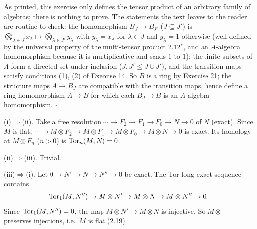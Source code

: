 \documentclass[11pt]{article}
\begin{document}
\pf
As printed, this exercise only defines the tensor product of an arbitrary family of algebras; there is nothing to prove. The statements the text leaves to the reader are routine to check:
the homomorphism $B_J\to B_{J'}$ ($J\subseteq J'$) is $\bigotimes_{\lambda\in J}x_\lambda\mapsto\bigotimes_{\lambda\in J'}y_\lambda$ with $y_\lambda=x_\lambda$ for $\lambda\in J$ and $y_\lambda=1$ otherwise (well defined by the universal property of the multi-tensor product 2.12$^*$, and an $A$-algebra homomorphism because it is multiplicative and sends $1$ to $1$); the finite subsets of $\Lambda$ form a directed set under inclusion ($J,J'\le J\cup J'$), and the transition maps satisfy conditions (1), (2) of Exercise 14. So $B$ is a ring by Exercise 21; the structure maps $A\to B_J$ are compatible with the transition maps, hence define a ring homomorphism $A\to B$ for which each $B_J\to B$ is an $A$-algebra homomorphism. \hfill$\square$

\pf
(i)$\Rightarrow$(ii). Take a free resolution $\cdots\to F_2\to F_1\to F_0\to N\to0$ of $N$ (exact). Since $M$ is flat, $\cdots\to M\otimes F_2\to M\otimes F_1\to M\otimes F_0\to M\otimes N\to0$ is exact. Its homology at $M\otimes F_n$ ($n>0$) is $\operatorname{Tor}_n(M,N)=0$.

(ii)$\Rightarrow$(iii). Trivial.

(iii)$\Rightarrow$(i). Let $0\to N'\to N\to N''\to0$ be exact. The Tor long exact sequence contains
\[
\operatorname{Tor}_1(M,N'')\to M\otimes N'\to M\otimes N\to M\otimes N''\to0 .
\]
Since $\operatorname{Tor}_1(M,N'')=0$, the map $M\otimes N'\to M\otimes N$ is injective. So $M\otimes-$ preserves injections, i.e.\ $M$ is flat (2.19). \hfill$\square$
\end{document}
